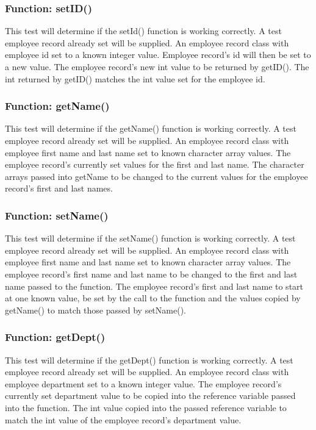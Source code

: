 \documentclass[12pt]{article}%
\newcounter{subsubsubsection}[subsubsection]
\begin{document}
\subsubsection{Function: setID()}
This test will determine if the setId() function is working correctly. A test
employee record already set will be supplied.
An employee record class with employee id set to a known integer value.
Employee record's id  will then be set to a new value.
The employee record's new int value to be returned by getID().
The int returned by getID() matches the int value set for the employee id.

\subsubsection{Function: getName()}
This test will determine if the getName() function is working correctly. A test
employee record already set will be supplied.
An employee record class with employee first name and last name set to known character
array values.
The employee record's currently set values for the first and last name.
The character arrays passed into getName to be changed to the current values
for the employee record's first and last names.

\subsubsection{Function: setName()}
This test will determine if the setName() function is working correctly. A test
employee record already set will be supplied.
An employee record class with employee first name and last name set to known
character array values.
The employee record's first name and last name to be changed to the first and
last name passed to the function.
The employee record's first and last name to start at one known value, be set by the call
to the function and the values copied by getName() to match those passed by setName().

\subsubsection{Function: getDept()}
This test will determine if the getDept() function is working correctly. A test
employee record already set will be supplied.
An employee record class with employee department set to a known integer value.
The employee record's currently set department value to be copied into the reference variable
passed into the function.
The int value copied into the passed reference variable to match the int value of the employee record's
department value.
\end{document}
